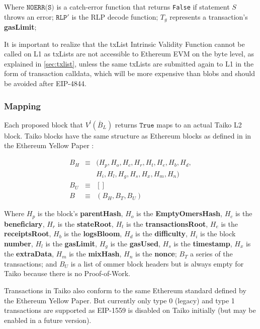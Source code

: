 \documentclass[9pt,oneside]{amsart}
\begin{document}
\begin{multicols}{2}
Where $\texttt{NOERR(S)}$ is a catch-error function that returns \texttt{False} if statement $S$ throws an error; $\texttt{RLP}'$ is the RLP decode function;  $T_g$ represents a transaction's \textbf{gasLimit}; 





It is important to realize that the txList Intrinsic Validity Function cannot be called on L1 as txLists are not accessible to Ethereum EVM on the byte level, as explained in \ref{sec:txlist}, unless the same txLists are submitted again to L1 in the form of transaction calldata, which will be more expensive than blobs and should be avoided after EIP-4844.

\subsubsection{Mapping}

Each proposed block that $V^l(\bar{B}_L)$ returns $\texttt{True}$ maps to an actual Taiko L2 block. Taiko blocks have the same structure as Ethereum blocks as defined in in the Ethereum Yellow Paper \cite{ethyellowpaper}:

\begin{eqnarray}
B_H & \equiv & (H_p, H_o, H_c, H_r, H_t, H_e, H_b, H_d, \\
\nonumber & & H_i, H_l,H_g, H_s, H_x, H_m, H_n) \\
B_U  & \equiv & [] \\
B & \equiv & (B_H, B_T, B_U)
\end{eqnarray}

Where $H_p$ is the block's \textbf{parentHash}, $H_o$ is the \textbf{EmptyOmersHash}, $H_c$ is the \textbf{beneficiary}, $H_r$ is the \textbf{stateRoot}, $H_t$ is the \textbf{transactionsRoot}, $H_e$ is the \textbf{receiptsRoot}, $H_b$ is the \textbf{logsBloom}, $H_d$ is the \textbf{difficulty}, $H_i$ is the block \textbf{number}, $H_l$ is the \textbf{gasLimit}, $H_g$ is the \textbf{gasUsed}, $H_s$ is the \textbf{timestamp}, $H_x$ is the \textbf{extraData}, $H_m$ is the \textbf{mixHash}, $H_n$ is the \textbf{nonce}; $B_T$ a series of the transactions; and $B_U$ is a list of ommer block headers but is always empty for Taiko because there is no Proof-of-Work.

Transactions in Taiko also conform to the same Ethereum standard defined by the Ethereum Yellow Paper. But currently only type 0 (legacy) and type 1 transactions are supported as EIP-1559 is disabled on Taiko initially (but may be enabled in a future version).


\end{multicols}
\end{document}

